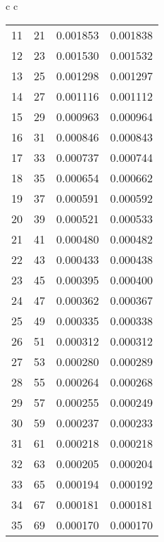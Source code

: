 \begin{center}
\begin{tabular}{c c}
\begin{tabular}{l | c | c c}
            11 &      21 &  0.001853 &  0.001838 \\
            12 &      23 &  0.001530 &  0.001532 \\
            13 &      25 &  0.001298 &  0.001297 \\
            14 &      27 &  0.001116 &  0.001112 \\
            15 &      29 &  0.000963 &  0.000964 \\
            16 &      31 &  0.000846 &  0.000843 \\
            17 &      33 &  0.000737 &  0.000744 \\
            18 &      35 &  0.000654 &  0.000662 \\
            19 &      37 &  0.000591 &  0.000592 \\
            20 &      39 &  0.000521 &  0.000533 \\
            21 &      41 &  0.000480 &  0.000482 \\
            22 &      43 &  0.000433 &  0.000438 \\
            23 &      45 &  0.000395 &  0.000400 \\
            24 &      47 &  0.000362 &  0.000367 \\
            25 &      49 &  0.000335 &  0.000338 \\
            26 &      51 &  0.000312 &  0.000312 \\
            27 &      53 &  0.000280 &  0.000289 \\
            28 &      55 &  0.000264 &  0.000268 \\
            29 &      57 &  0.000255 &  0.000249 \\
            30 &      59 &  0.000237 &  0.000233 \\
            31 &      61 &  0.000218 &  0.000218 \\
            32 &      63 &  0.000205 &  0.000204 \\
            33 &      65 &  0.000194 &  0.000192 \\
            34 &      67 &  0.000181 &  0.000181 \\
            35 &      69 &  0.000170 &  0.000170 \\
        \end{tabular}
    \end{tabular}    
    \label{tab:fourierkoeff}
\end{center}
